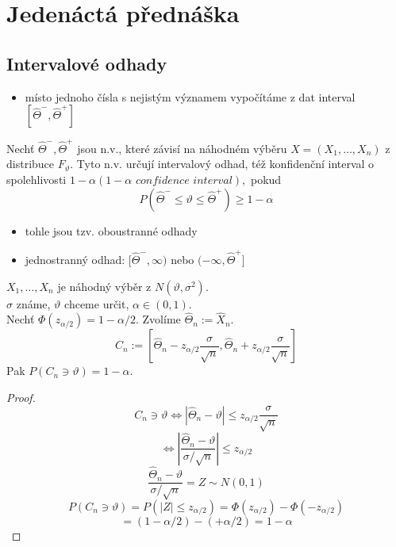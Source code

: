 \documentclass[../main.tex]{subfiles}
\begin{document}
\section{Jedenáctá přednáška}

\subsection{Intervalové odhady}
\begin{itemize}
    \item místo jednoho čísla s nejistým významem vypočítáme z dat interval $[\widehat{\Theta}^-, \widehat{\Theta}^+]$
\end{itemize}
\begin{definition}
    Nechť $\widehat{\Theta}^-, \widehat{\Theta}^+$ jsou n.v., které závisí na náhodném výběru 
    $X = (X_1,\dots,X_n)$ z distribuce $F_{\vartheta}$. Tyto n.v. určují intervalový odhad, též konfidenční interval o spolehlivosti
    $1-\alpha (1-\alpha \textit{ confidence interval}),$ pokud 
    \[P(\widehat{\Theta}^- \leq \vartheta \leq \widehat{\Theta}^+) \geq 1 - \alpha\]
    \begin{itemize}
        \item tohle jsou tzv. oboustranné odhady
        \item jednostranný odhad: $[\widehat{\Theta}^-, \infty)$ nebo $(-\infty, \widehat{\Theta}^+]$
    \end{itemize}
\end{definition}
\begin{theorem}
    $X_1,\dots,X_n$ je náhodný výběr z $N(\vartheta, \sigma^2)$.\\
    $\sigma$ známe, $\vartheta$ chceme určit, $\alpha \in (0,1)$.\\
    Nechť $\Phi(z_{\alpha/2}) = 1 - \alpha / 2$. Zvolíme $\widehat{\Theta}_n := \widehat{X}_n$.
    \[C_n := [\widehat{\Theta}_n - z_{\alpha/2}\frac{\sigma}{\sqrt{n}}, \widehat{\Theta}_n + z_{\alpha/2}\frac{\sigma}{\sqrt{n}}]\]
    Pak $P(C_n \ni \vartheta) = 1 - \alpha$.
    \begin{proof}
        \[C_n \ni \vartheta \Leftrightarrow |\widehat{\Theta}_n - \vartheta | \leq z_{\alpha/2}\frac{\sigma}{\sqrt{n}}\]
        \[\Leftrightarrow \left|\frac{\widehat{\Theta}_n - \vartheta}{\sigma/\sqrt{n}}\right| \leq z_{\alpha/2}\]
        \[ \frac{\widehat{\Theta}_n - \vartheta}{\sigma/\sqrt{n}} = Z \sim N(0,1)\]
        \[P(C_n \ni \vartheta) = P(|Z| \leq z_{\alpha/2}) = \Phi(z_{\alpha/2}) - \Phi(-z_{\alpha/2})\]
        \[= (1- \alpha/2) - (+ \alpha/2) = 1 - \alpha\]
    \end{proof}
\end{theorem}
\end{document}
